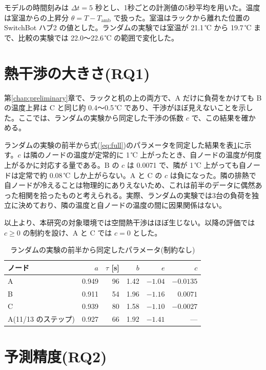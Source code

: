 モデルの時間刻みは $\Delta t = 5$ 秒とし、1秒ごとの計測値の5秒平均を用いた。温度は室温からの上昇分 $\theta = T - T_{\mathrm{amb}}$ で扱った。室温はラックから離れた位置の SwitchBot ハブ2 の値とした。ランダムの実験では室温が 21.1\,℃ から 19.7\,℃ まで、比較の実験では 22.0〜22.6\,℃ の範囲で変化した。

\section{熱干渉の大きさ(RQ1)}\label{sec:eval-interference}
第\ref{chap:preliminary}章で、ラックと机の上の両方で、A だけに負荷をかけても B の温度上昇は C と同じ約 0.4〜0.5\,℃ であり、干渉がほぼ見えないことを示した。ここでは、ランダムの実験から同定した干渉の係数 $c$ で、この結果を確かめる。

ランダムの実験の前半から式(\ref{eq:full})のパラメータを同定した結果を表\ref{tab:eval-identify}に示す。$c$ は隣のノードの温度が定常的に 1\,℃ 上がったとき、自ノードの温度が何度上がるかに対応する量である。B の $c$ は 0.0071 で、隣が 1\,℃ 上がっても自ノードは定常で約 0.08\,℃ しか上がらない。A と C の $c$ は負になった。隣の排熱で自ノードが冷えることは物理的にありえないため、これは前半のデータに偶然あった相関を拾ったものと考えられる。実際、ランダムの実験では3台の負荷を独立に決めており、隣の温度と自ノードの温度の間に因果関係はない。

以上より、本研究の対象環境では空間熱干渉はほぼ生じない。以降の評価では $c \geq 0$ の制約を設け、A と C では $c = 0$ とした。

\begin{table}[tb]
  \centering
  \caption{ランダムの実験の前半から同定したパラメータ(制約なし)}
  \label{tab:eval-identify}
  \begin{tabular}{lrrrrr}
    \toprule
    ノード & $a$ & $\tau$ [s] & $b$ & $e$ & $c$ \\
    \midrule
    A & 0.949 & 96 & 1.42 & $-1.04$ & $-0.0135$ \\
    B & 0.911 & 54 & 1.96 & $-1.16$ & $0.0071$ \\
    C & 0.939 & 80 & 1.58 & $-1.10$ & $-0.0027$ \\
    A(11/13 のステップ) & 0.927 & 66 & 1.92 & $-1.41$ & --- \\
    \bottomrule
  \end{tabular}
\end{table}

\section{予測精度(RQ2)}\label{sec:eval-predict}
